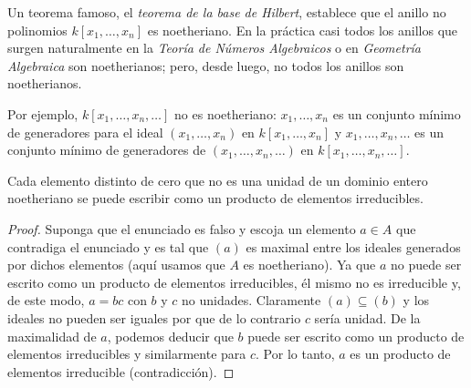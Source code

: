 Un teorema famoso, el \emph{teorema de la base de Hilbert}, establece que el anillo no polinomios $k[x_1,\ldots,x_n]$ es noetheriano. En la práctica casi todos los anillos que surgen naturalmente en la \emph{Teoría de Números Algebraicos} o en \emph{Geometría Algebraica} son noetherianos; pero, desde luego, no todos los anillos son noetherianos.

Por ejemplo, $k[x_1,\ldots,x_n,\ldots]$ no es noetheriano: $x_1, \ldots, x_n$ es un conjunto mínimo de generadores para el ideal $(x_1,\ldots,x_n)$ en $k[x_1,\ldots,x_n]$ y $x_1,\ldots,x_n,\ldots$ es un conjunto mínimo de generadores de $(x_1,\ldots,x_n,\ldots)$ en $k[x_1,\ldots,x_n,\ldots]$.

\begin{proposition}
  Cada elemento distinto de cero que no es una unidad de un dominio entero noetheriano se puede escribir como un producto de elementos irreducibles.
\end{proposition}
\begin{proof}
  Suponga que el enunciado es falso y escoja un elemento $a\in A$ que contradiga el enunciado y es tal que $(a)$ es maximal entre los ideales generados por dichos elementos (aquí usamos que $A$ es noetheriano). Ya que $a$ no puede ser escrito como un producto de elementos irreducibles, él mismo no es irreducible y, de este modo, $a = bc$ con $b$ y $c$ no unidades. Claramente $(a) \subseteq (b) $ y los ideales no pueden ser iguales por que de lo contrario $c$ sería unidad. De la maximalidad de $a$, podemos deducir que $b$ puede ser escrito como un producto de elementos irreducibles y similarmente para $c$. Por lo tanto, $a$ es un producto de elementos irreducible (contradicción).
\end{proof}